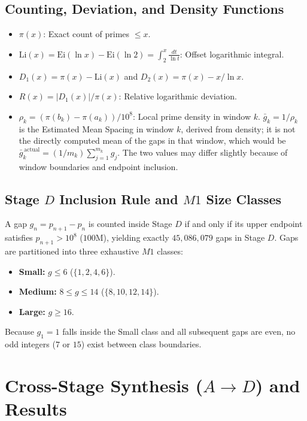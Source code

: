 \documentclass[12pt,a4paper]{article}
\begin{document}
\subsection{Counting, Deviation, and Density Functions}
\begin{itemize}
    \item $\pi(x)$: Exact count of primes $\leq x$.
    \item $\mathrm{Li}(x) = \mathrm{Ei}(\ln x) - \mathrm{Ei}(\ln 2) = \int_2^x \frac{dt}{\ln t}$: Offset logarithmic integral.
    \item $D_1(x) = \pi(x) - \mathrm{Li}(x)$ and $D_2(x) = \pi(x) - x/\ln x$.
    \item $R(x) = |D_1(x)| / \pi(x)$: Relative logarithmic deviation.
    \item $\rho_k = (\pi(b_k) - \pi(a_k)) / 10^8$: Local prime density in window $k$. $\bar{g}_k = 1/\rho_k$ is the Estimated Mean Spacing in window $k$, derived from density; it is not the directly computed mean of the gaps in that window, which would be $\bar{g}_k^{\,\mathrm{actual}} = (1/m_k)\sum_{j=1}^{m_k} g_j$. The two values may differ slightly because of window boundaries and endpoint inclusion.
\end{itemize}
\subsection{Stage $D$ Inclusion Rule and $M1$ Size Classes}
A gap $g_n = p_{n+1} - p_n$ is counted inside Stage $D$ if and only if its upper endpoint satisfies $p_{n+1} > 10^8$ ($100\text{M}$), yielding exactly $45,086,079$ gaps in Stage $D$. Gaps are partitioned into three exhaustive $M1$ classes:
\begin{itemize}
    \item \textbf{Small:} $g \leq 6$ ($\{1, 2, 4, 6\}$).
    \item \textbf{Medium:} $8 \leq g \leq 14$ ($\{8, 10, 12, 14\}$).
    \item \textbf{Large:} $g \geq 16$.
\end{itemize}
Because $g_1 = 1$ falls inside the Small class and all subsequent gaps are even, no odd integers ($7$ or $15$) exist between class boundaries.
\section{Cross-Stage Synthesis ($A \rightarrow D$) and Results}
\end{document}
